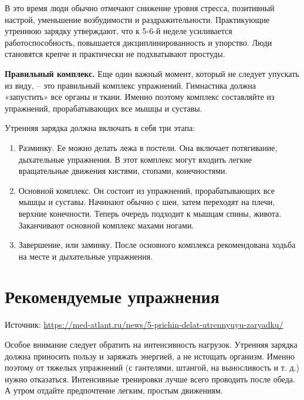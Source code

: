 В это время люди обычно отмечают снижение уровня стресса, позитивный настрой, уменьшение возбудимости и раздражительности. Практикующие утреннюю зарядку утверждают, что к 5-6-й неделе усиливается работоспособность, повышается дисциплинированность и упорство. Люди становятся крепче и практически не подхватывают простуды.

\textbf{Правильный комплекс.} Еще один важный момент, который не следует упускать из виду, – это правильный комплекс упражнений. Гимнастика должна «запустить» все органы и ткани. Именно поэтому комплекс составляйте из упражнений, прорабатывающих все мышцы и суставы.



Утренняя зарядка должна включать в себя три этапа:
\begin{enumerate}
    \item Разминку. Ее можно делать лежа в постели. Она включает потягивание, дыхательные упражнения. В этот комплекс могут входить легкие вращательные движения кистями, стопами, конечностями.
    \item Основной комплекс. Он состоит из упражнений, прорабатывающих все мышцы и суставы. Начинают обычно с шеи, затем переходят на плечи, верхние конечности. Теперь очередь подходит к мышцам спины, живота. Заканчивают основной комплекс махами ногами.
    \item Завершение, или заминку. После основного комплекса рекомендована ходьба на месте и дыхательные упражнения.
\end{enumerate}



\section{Рекомендуемые упражнения}
Источник: \url{https://med-atlant.ru/news/5-prichin-delat-utrennyuyu-zaryadku/}

Особое внимание следует обратить на интенсивность нагрузок. Утренняя зарядка должна приносить пользу и заряжать энергией, а не истощать организм. Именно поэтому от тяжелых упражнений (с гантелями, штангой, на выносливость и т. д.) нужно отказаться. Интенсивные тренировки лучше всего проводить после обеда. А утром отдайте предпочтение легким, простым движениям.

